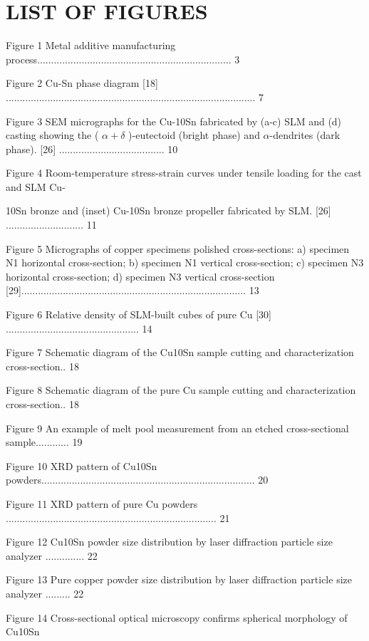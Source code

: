 \documentclass[10pt]{article}
\begin{document}
\section*{LIST OF FIGURES}
Figure 1 Metal additive manufacturing process...................................................................... 3

Figure 2 Cu-Sn phase diagram [18] .......................................................................................... 7

Figure 3 SEM micrographs for the Cu-10Sn fabricated by (a-c) SLM and (d) casting showing the ( $\alpha+\delta$ )-eutectoid (bright phase) and $\alpha$-dendrites (dark phase). [26] ...................................... 10

Figure 4 Room-temperature stress-strain curves under tensile loading for the cast and SLM Cu-

10Sn bronze and (inset) Cu-10Sn bronze propeller fabricated by SLM. [26] ............................ 11

Figure 5 Micrographs of copper specimens polished cross-sections: a) specimen N1 horizontal cross-section; b) specimen N1 vertical cross-section; c) specimen N3 horizontal cross-section; d) specimen N3 vertical cross-section [29]................................................................................. 13

Figure 6 Relative density of SLM-built cubes of pure Cu [30] ................................................ 14

Figure 7 Schematic diagram of the Cu10Sn sample cutting and characterization cross-section.. 18

Figure 8 Schematic diagram of the pure Cu sample cutting and characterization cross-section.. 18

Figure 9 An example of melt pool measurement from an etched cross-sectional sample............ 19

Figure 10 XRD pattern of Cu10Sn powders............................................................................. 20

Figure 11 XRD pattern of pure Cu powders ............................................................................ 21

Figure 12 Cu10Sn powder size distribution by laser diffraction particle size analyzer .............. 22

Figure 13 Pure copper powder size distribution by laser diffraction particle size analyzer ......... 22

Figure 14 Cross-sectional optical microscopy confirms spherical morphology of Cu10Sn
\end{document}
